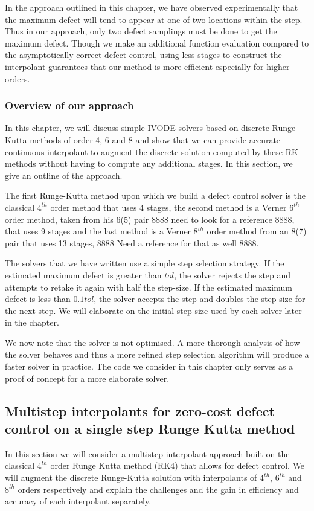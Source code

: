 \documentclass{article}
\begin{document}
In the approach outlined in this chapter, we have observed experimentally that the maximum defect will tend to appear at one of two locations within the step. Thus in our approach, only two defect samplings must be done to get the maximum defect. Though we make an additional function evaluation compared to the asymptotically correct defect control, using less stages to construct the interpolant guarantees that our method is more efficient especially for higher orders.


\subsubsection{Overview of our approach}
\label{section:basic_runge_kutta}
In this chapter, we will discuss simple IVODE solvers based on discrete Runge-Kutta methods of order 4, 6 and 8 and show that we can provide accurate continuous interpolant to augment the discrete solution computed by these RK methods without having to compute any additional stages. In this section, we give an outline of the approach.

The first Runge-Kutta method upon which we build a defect control solver is the classical $4^{th}$ order method that uses 4 stages, the second method is a Verner $6^{th}$ order method, taken from his 6(5) pair 8888 need to look for a reference 8888, that uses 9 stages and the last method is a Verner $8^{th}$ order method from an 8(7) pair that uses 13 stages, 8888 Need a reference for that as well 8888. 

The solvers that we have written use a simple step selection strategy. If the estimated maximum defect is greater than $tol$, the solver rejects the step and attempts to retake it again with half the step-size. If the estimated maximum defect is less than $0.1tol$, the solver accepts the step and doubles the step-size for the next step. We will elaborate on the initial step-size used by each solver later in the chapter.

We now note that the solver is not optimised. A more thorough analysis of how the solver behaves and thus a more refined step selection algorithm will produce a faster solver in practice. The code we consider in this chapter only serves as a proof of concept for a more elaborate solver. 

\subsection{Multistep interpolants for zero-cost defect control on a single step Runge Kutta method}
\label{section:equipping_rk4_with_HBs}
In this section we will consider a multistep interpolant approach built on the classical $4^{th}$ order Runge Kutta method (RK4) that allows for defect control. We will augment the discrete Runge-Kutta solution with interpolants of $4^{th}$, $6^{th}$ and $8^{th}$ orders respectively and explain the challenges and the gain in efficiency and accuracy of each interpolant separately. 
\end{document}
